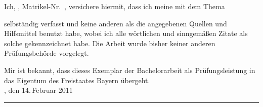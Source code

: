 \small
Ich, \autor, Matrikel-Nr.\ \matrikelnr, versichere hiermit, dass ich meine \art{} mit dem Thema
\begin{quote}
\textit{\titel}
\end{quote}
selbständig verfasst und keine anderen als die angegebenen Quellen und Hilfsmittel benutzt habe, wobei ich alle wörtlichen und sinngemäßen Zitate als solche gekennzeichnet habe. Die Arbeit wurde bisher keiner anderen Prüfungsbehörde vorgelegt.

Mir ist bekannt, dass dieses Exemplar der Bachelorarbeit als Prüfungsleistung in das Eigentum des Freistaates Bayern übergeht.\\[1ex]

\ort, den 14.\,Februar 2011\\[2.5ex]

\rule[-0.2cm]{5cm}{0.5pt}

\textsc{\autor} 
\normalsize